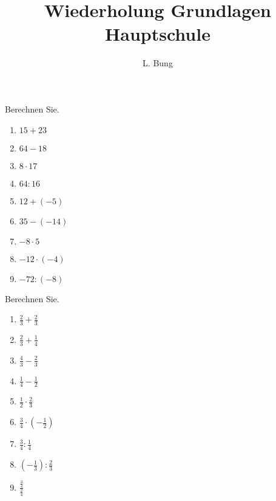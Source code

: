 \documentclass[11pt, a4paper, oneside]{article}
\begin{document}
	\author{L. Bung}
	\title{Wiederholung \hspace{5cm} Grundlagen Hauptschule}
	\subject{Mathematik}
	\maketitle
	
	
	Berechnen Sie.
	
	\begin{multicols}{3}
		\begin{enumerate}[label=\alph*)]
			\item $15 + 23$
			\item $64 - 18$
			\item $8 \cdot 17$
			\item $64 : 16$
			\item $12 + (-5)$
			\item $35 - (-14)$
			\item $-8 \cdot 5$
			\item $-12 \cdot (-4)$
			\item $-72 : (-8)$
		\end{enumerate}
	\end{multicols}
	
	\checkered[5cm]
	
	
	Berechnen Sie.
	
	\begin{multicols}{3}
		\begin{enumerate}[label=\alph*)]
			\item $\frac{2}{3} + \frac{2}{3}$
			\item $\frac{2}{3} + \frac{1}{4}$
			\item $\frac{4}{3} - \frac{2}{3}$
			\item $\frac{1}{4} - \frac{1}{2}$
			\item $\frac{1}{2} \cdot \frac{2}{3}$
			\item $\frac{3}{4} \cdot \left(-\frac{1}{2}\right)$
			\item $\frac{3}{4} : \frac{1}{4}$
			\item $\left(-\frac{1}{3}\right) : \frac{2}{3}$
			\item $\frac{\frac{3}{4}}{\frac{2}{4}}$
		\end{enumerate}
	\end{multicols}
	
\end{document}

